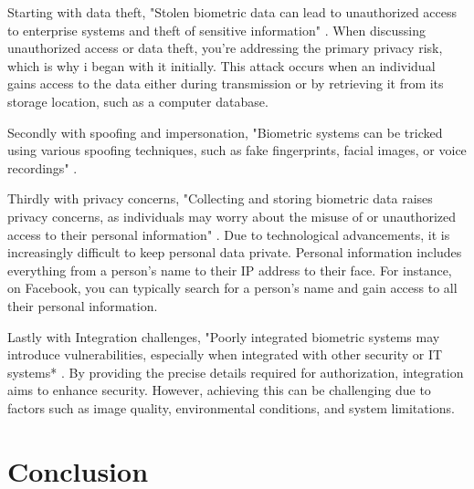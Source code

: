 \documentclass[conference]{IEEEtran}
\begin{document}
Starting with data theft, "Stolen biometric data can lead to unauthorized access to enterprise systems and theft of sensitive information" \cite{darkreading2024}. When discussing unauthorized access or data theft, you're addressing the primary privacy risk, which is why i began with it initially. This attack occurs when an individual gains access to the data either during transmission or by retrieving it from its storage location, such as a computer database.

Secondly with spoofing and impersonation, "Biometric systems can be tricked using various spoofing techniques, such as fake fingerprints, facial images, or voice recordings" \cite{darkreading2024}.

Thirdly with privacy concerns, "Collecting and storing biometric data raises privacy concerns, as individuals may worry about the misuse of or unauthorized access to their personal information" \cite{darkreading2024}. Due to technological advancements, it is increasingly difficult to keep personal data private.
Personal information includes everything from a person's name to their IP address to their face. For instance, on Facebook, you can typically search for a person's name and gain access to all their personal information.

Lastly with Integration challenges, "Poorly integrated biometric systems may introduce vulnerabilities, especially when integrated with other security or IT systems* \cite{darkreading2024}. By providing the precise details required for authorization, integration aims to enhance security. However, achieving this can be challenging due to factors such as image quality, environmental conditions, and system limitations.

\section{Conclusion}



\end{document}
